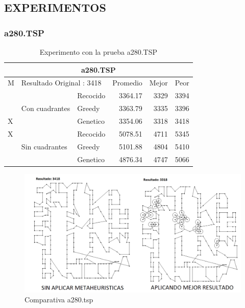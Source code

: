 \clearpage \newpage
\subsection{ EXPERIMENTOS}

\subsubsection{a280.TSP}
\begin{table}[hbtp]
 \centering
 \small
	\begin{tabular}{| l | l   l | r | r | r |   }
	    \hline\multicolumn{6}{|c|}{ \rowcolor[gray]{0.8}a280.TSP} \\\hline
     M  &\multicolumn{2}{|l|}{Resultado Original : 3418}   & Promedio & Mejor & Peor \\ \hline
        &                & Recocido  &  3364.17 & 3329 & 3394  \\ 
        & Con cuadrantes & Greedy    &  3363.79 & 3335 & 3396  \\ 
     X  &                & Genetico  &  3354.06 & 3318 & 3418  \\ \hline
     X  &                & Recocido  &  5078.51 & 4711 & 5345   \\ 
        & Sin cuadrantes & Greedy    &  5101.88 & 4804 & 5410   \\ 
        &                & Genetico  &  4876.34 & 4747 & 5066    \\ \hline
    \end{tabular}
    \caption{Experimento con la prueba a280.TSP}
    \label{table:EXP_a280.TSP}
\end{table}
 \begin{figure}[hbtp]
    \centering
        \includegraphics[width=1\textwidth]{PruebasResultados/Experimentos_Comparativas/a280.png}
        \caption{Comparativa a280.tsp}
        \label{fig:a280_comparativa.png}
\end{figure}
